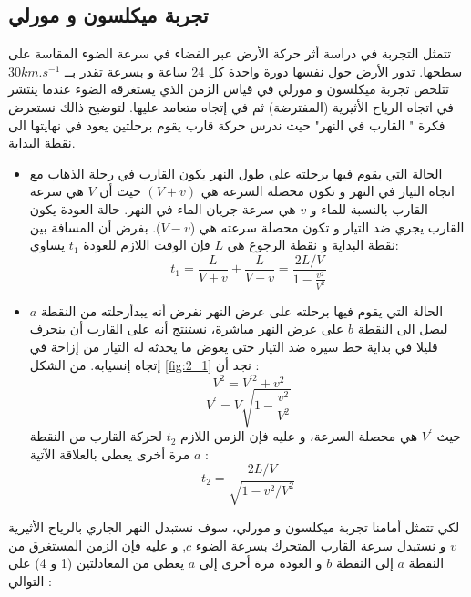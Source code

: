 \subsection{تجربة ميكلسون و مورلي}
تتمثل التجربة في دراسة أثر حركة اﻷرض عبر الفضاء في سرعة الضوء المقاسة على سطحها. تدور اﻷرض حول نفسها دورة واحدة كل 24 ساعة و بسرعة تقدر بــ $30 km.s^{-1}$                                                                                                                                                                                                                                                                                                                                     
تتلخص تجربة ميكلسون و مورلي في قياس الزمن الذي يستغرقه الضوء عندما ينتشر في اتجاه الرياح اﻷثيرية (المفترضة) ثم في إتجاه متعامد عليها. لتوضيح ذالك نستعرض فكرة " القارب في النهر" حيث ندرس حركة قارب يقوم برحلتين يعود في نهايتها الى نقطة البداية.
\begin{itemize}
	\item الحالة التي يقوم فيها برحلته على طول النهر يكون القارب في رحلة الذهاب مع اتجاه التيار في النهر و تكون محصلة السرعة هي $ (V+ v)$
حيث أن $V$ هي سرعة القارب بالنسبة للماء و $v$ هي سرعة جريان الماء في النهر. حالة العودة يكون القارب يجري ضد التيار و تكون محصلة سرعته هي ($V-v$).  بفرض أن المسافة بين نقطة البداية و نقطة الرجوع هي  $L$  فإن الوقت اللازم للعودة  $t_{1}$  يساوي:
 \begin{equation}
 	t_{1}=\dfrac{L}{V+v}+ \dfrac{L}{V-v} = \dfrac{2L/V}{1-\frac{v^{2}}{V^{2}}}
  \end{equation}
  \item 
الحالة التي يقوم فيها برحلته على عرض النهر نفرض أنه يبدأرحلته من النقطة $a$ ليصل الى النقطة $b$ على عرض النهر مباشرة، نستنتج أنه على القارب أن ينحرف قليلا في بداية خط سيره ضد التيار حتى يعوض ما يحدثه له التيار من إزاحة في إتجاه إنسيابه.
من الشكل \ref{fig:2_1} نجد أن :
\begin{equation}
	V^{2}= V^{'2} + v^{2}
\end{equation}
\begin{equation}
	V^{'} = V\sqrt{1-\frac{v^{2}}{V^{2}}}
\end{equation}
حيث $V^{'}$ هي محصلة السرعة، و عليه فإن الزمن اللازم $t_{2}$ لحركة القارب من النقطة $a$ مرة أخرى يعطى بالعلاقة اﻵتية :
\begin{equation}
	t_{2} = \dfrac{2L/V}{\sqrt{1-v^{2}/V^{2}}}
\end{equation}
\end{itemize} 
لكي تتمثل أمامنا تجربة ميكلسون و مورلي، سوف نستبدل النهر الجاري بالرياح اﻷثيرية $v$ و نستبدل سرعة القارب المتحرك بسرعة الضوء $c$, و عليه فإن الزمن المستغرق من النقطة $a$ إلى النقطة $b$ و العودة مرة أخرى إلى $a$ يعطى من المعادلتين (1 و 4) على التوالي :
